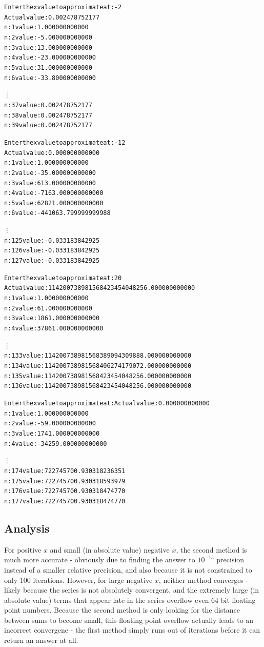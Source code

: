 \documentclass[11pt]{article} %
\begin{document}
\begin{alltt}
Enter the x value to approximate at: -2
Actual value: 0.002478752177 
n: 1	value: 1.000000000000
n: 2	value: -5.000000000000
n: 3	value: 13.000000000000
n: 4	value: -23.000000000000
n: 5	value: 31.000000000000
n: 6	value: -33.800000000000

\vdots
n: 37	value: 0.002478752177
n: 38	value: 0.002478752177
n: 39	value: 0.002478752177
\end{alltt}

\begin{alltt}
Enter the x value to approximate at: -12
Actual value: 0.000000000000 
n: 1	value: 1.000000000000
n: 2	value: -35.000000000000
n: 3	value: 613.000000000000
n: 4	value: -7163.000000000000
n: 5	value: 62821.000000000000
n: 6	value: -441063.799999999988

\vdots 
n: 125	 value: -0.033183842925
n: 126	 value: -0.033183842925
n: 127	 value: -0.033183842925

\end{alltt}

\begin{alltt}
Enter the x value to approximate at: 20
Actual value: 114200738981568423454048256.000000000000 
n: 1	value: 1.000000000000
n: 2	value: 61.000000000000
n: 3	value: 1861.000000000000
n: 4	value: 37861.000000000000

\vdots
n: 133	value: 114200738981568389094309888.000000000000
n: 134	value: 114200738981568406274179072.000000000000
n: 135	value: 114200738981568423454048256.000000000000
n: 136	value: 114200738981568423454048256.000000000000

\end{alltt}

\begin{alltt}
Enter the x value to approximate at: Actual value: 0.000000000000 
n: 1	value: 1.000000000000
n: 2	value: -59.000000000000
n: 3	value: 1741.000000000000
n: 4	value: -34259.000000000000

\vdots
n: 174	value: 722745700.930318236351
n: 175	value: 722745700.930318593979
n: 176	value: 722745700.930318474770
n: 177	value: 722745700.930318474770
\end{alltt}

\subsection*{Analysis}
\par For positive $x$ and small (in absolute value) negative $x$, the second method is much more accurate - obviously due to finding the answer to $10^{-15}$ precision instead of a smaller relative precision, and also because it is not constrained to only $100$ iterations. However, for large negative $x$, neither method converges - likely because the series is not absolutely convergent, and the extremely large (in absolute value) terms that appear late in the series overflow even 64 bit floating point numbers. Because the second method is only looking for the distance between sums to become small, this floating point overflow actually leads to an incorrect convergene - the first method simply runs out of iterations before it can return an answer at all.
\end{document}
